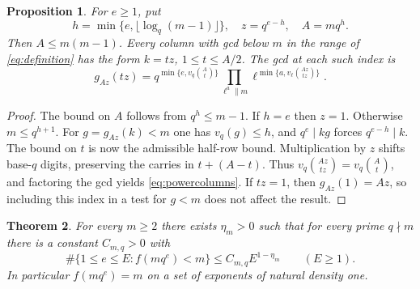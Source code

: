 \documentclass[a4paper,11pt]{article}
\newtheorem{theorem}{Theorem}[section]
\newtheorem{proposition}[theorem]{Proposition}
\newcommand{\colg}[2]{g_{#1}(#2)}
\begin{document}
\begin{proposition}\label{prop:candidates}
For \(e\ge1\), put
\[
 h=\min\{e,\lfloor\log_q(m-1)\rfloor\},\quad z=q^{e-h},\quad A=mq^h.
\]
Then \(A\le m(m-1)\). Every column with gcd below \(m\) in the range
of \eqref{eq:definition} has the form \(k=tz\), \(1\le t\le A/2\).
The gcd at each such index is
\begin{equation}\label{eq:powercolumns}
 \colg{Az}{tz}
 =q^{\min\{e,v_q\binom At\}}
   \prod_{\ell^a\parallel m}\ell^{\min\{a,v_\ell\binom{Az}{tz}\}} .
\end{equation}
\end{proposition}

\begin{proof}
The bound on \(A\) follows from \(q^h\le m-1\). If \(h=e\) then
\(z=1\). Otherwise \(m\le q^{h+1}\). For \(g=\colg{Az}{k}<m\)
one has \(v_q(g)\le h\), and \(q^e\mid kg\) forces \(q^{e-h}\mid k\).
The bound on \(t\) is now the admissible half-row bound. Multiplication
by \(z\) shifts base-\(q\) digits, preserving the carries in
\(t+(A-t)\). Thus \(v_q\binom{Az}{tz}=v_q\binom At\), and factoring
the gcd yields \eqref{eq:powercolumns}. If \(tz=1\), then
\(\colg{Az}{1}=Az\), so including this index in a test for \(g<m\)
does not affect the result.
\end{proof}

\begin{theorem}\label{thm:exponents}
For every \(m\ge2\) there exists \(\eta_m>0\) such that for every prime
\(q\nmid m\) there is a constant \(C_{m,q}>0\) with
\begin{equation}\label{eq:exponents}
 \#\{1\le e\le E: f(mq^e)<m\}
 \le C_{m,q}E^{1-\eta_m}\qquad(E\ge1).
\end{equation}
In particular \(f(mq^e)=m\) on a set of exponents of natural density one.
\end{theorem}
\end{document}
